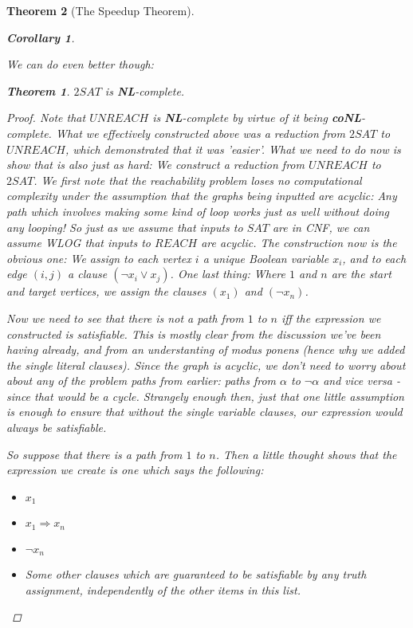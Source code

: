 \documentclass{article}
\theoremstyle{definition}
\theoremstyle{plain}
\theoremstyle{theorem}
\newtheorem{theorem}{Theorem}[section]
\newtheorem{corollary}{Corollary}[section]
\begin{document}
\begin{theorem}[The Speedup Theorem]
\begin{corollary}
\end{corollary}
We can do even better though:
\begin{theorem}
    $2SAT$ is \textbf{NL}-complete.
\end{theorem}
\begin{proof}
    Note that $UNREACH$ is \textbf{NL}-complete by virtue of it being \textbf{coNL}-complete. What we effectively constructed above was a reduction from $2SAT$ to $UNREACH$, which demonstrated that it was 'easier'. What we need to do now is show that is also just as hard: We construct a reduction from $UNREACH$ to $2SAT$. We first note that the reachability problem loses no computational complexity under the assumption that the graphs being inputted are \textit{acyclic}: Any path which involves making some kind of loop works just as well without doing any looping! So just as we assume that inputs to $SAT$ are in CNF, we can assume WLOG that inputs to $REACH$ are acyclic. The construction now is the obvious one: We assign to each vertex $i$ a unique Boolean variable $x_i$, and to each edge $(i,j)$ a clause $(\neg x_i \vee x_j)$. One last thing: Where $1$ and $n$ are the start and target vertices, we assign the clauses $(x_1)$ and $(\neg x_n)$.
    \par Now we need to see that there is \textit{not} a path from $1$ to $n$ iff the expression we constructed is satisfiable. This is mostly clear from the discussion we've been having already, and from an understanting of modus ponens (hence why we added the single literal clauses). Since the graph is acyclic, we don't need to worry about about any of the problem paths from earlier: paths from $\alpha$ to $\neg \alpha$ and vice versa - since that would be a cycle. Strangely enough then, just that one little assumption is enough to ensure that without the single variable clauses, our expression would always be satisfiable.
    \par So suppose that there is a path from $1$ to $n$. Then a little thought shows that the expression we create is one which says the following:
        \begin{itemize}
            \item $x_1$
            \item $x_1 \Rightarrow x_n$
            \item $\neg x_n$
            \item Some other clauses which are guaranteed to be satisfiable by any truth assignment, independently of the other items in this list.
        \end{itemize}

\end{proof}
\end{theorem}
\end{document}
